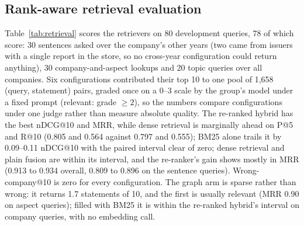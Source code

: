 \documentclass[11pt]{article}
\begin{document}
\subsection{Rank-aware retrieval evaluation}
\label{sec:rq1-retrieval}
Table~\ref{tab:retrieval} scores the retrievers on 80 development queries, 78 of which score: 30 sentences asked over the company's other years (two came from issuers with a single report in the store, so no cross-year configuration could return anything), 30 company-and-aspect lookups and 20 topic queries over all companies. Six configurations contributed their top 10 to one pool of 1,658 (query, statement) pairs, graded once on a 0--3 scale by the group's model under a fixed prompt (relevant: grade $\ge 2$), so the numbers compare configurations under one judge rather than measure absolute quality. The re-ranked hybrid has the best nDCG@10 and MRR, while dense retrieval is marginally ahead on P@5 and R@10 (0.805 and 0.564 against 0.797 and 0.555); BM25 alone trails it by 0.09--0.11 nDCG@10 with the paired interval clear of zero; dense retrieval and plain fusion are within its interval, and the re-ranker's gain shows mostly in MRR (0.913 to 0.934 overall, 0.809 to 0.896 on the sentence queries). Wrong-company@10 is zero for every configuration. The graph arm is sparse rather than wrong: it returns 1.7 statements of 10, and the first is usually relevant (MRR 0.90 on aspect queries); filled with BM25 it is within the re-ranked hybrid's interval on company queries, with no embedding call.
\end{document}
